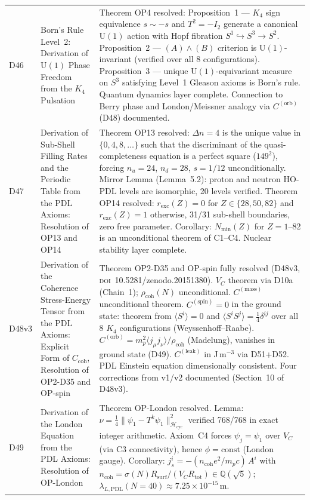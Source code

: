 \documentclass[11pt,a4paper]{article}
\theoremstyle{plain}
\theoremstyle{definition}
\theoremstyle{remark}
\newcommand{\Rsurf}{R_{\mathrm{surf}}}
\newcommand{\Rtot}{R_{\mathrm{tot}}}
\newcommand{\rhocoh}{\rho_{\mathrm{coh}}}
\newcommand{\Ccoh}{C_{\mathrm{coh}}}
\begin{document}
\begin{longtable}{L{1.3cm}L{3.8cm}L{8.0cm}}
D46 & Born's Rule Level~2: Derivation of $\mathrm{U}(1)$ Phase Freedom from the $K_4$ Pulsation~\cite{D46} & \textcolor{proofblue}{Theorem} OP4 resolved: Proposition~1 — $K_4$ sign equivalence $s \sim -s$ and $T^2=-I_2$ generate a canonical $\mathrm{U}(1)$ action with Hopf fibration $S^1\hookrightarrow S^3\to S^2$. Proposition~2 — $(A)\wedge(B)$ criterion is $\mathrm{U}(1)$-invariant (verified over all 8 configurations). Proposition~3 — unique $\mathrm{U}(1)$-equivariant measure on $S^3$ satisfying Level~1 Gleason axioms is Born's rule. Quantum dynamics layer complete. Connection to Berry phase and London/Meissner analogy via $C^{(\mathrm{orb})}$ (D48) documented.\\[0.4em]
D47 & Derivation of Sub-Shell Filling Rates and the Periodic Table from the PDL Axioms: Resolution of OP13 and OP14~\cite{D47} & \textcolor{proofblue}{Theorem} OP13 resolved: $\Delta n=4$ is the unique value in $\{0,4,8,\ldots\}$ such that the discriminant of the quasi-completeness equation is a perfect square ($149^2$), forcing $n_u=24$, $n_d=28$, $s=1/12$ unconditionally. Mirror Lemma (Lemma~5.2): proton and neutron HO-PDL levels are isomorphic, 20 levels verified. \textcolor{proofblue}{Theorem} OP14 resolved: $r_{\mathrm{exc}}(Z)=0$ for $Z\in\{28,50,82\}$ and $r_{\mathrm{exc}}(Z)=1$ otherwise, 31/31 sub-shell boundaries, zero free parameter. Corollary: $N_{\min}(Z)$ for $Z=1$--82 is an unconditional theorem of C1--C4. Nuclear stability layer complete.\\[0.4em]
D48v3 & Derivation of the Coherence Stress-Energy Tensor from the PDL Axioms: Explicit Form of $\Ccoh$, Resolution of OP2-D35 and OP-spin~\cite{D48} & \textcolor{proofblue}{Theorem} OP2-D35 and OP-spin fully resolved (D48v3, \textsc{doi}~10.5281/zenodo.20151380). $V_C$ theorem via D10a (Chain~1); $\rhocoh(N)$ unconditional. $C^{(\mathrm{mass})}$ unconditional theorem. $C^{(\mathrm{spin})}=0$ in the ground state: theorem from $\langle S^i\rangle=0$ and $\langle S^iS^j\rangle=\tfrac{1}{4}\delta^{ij}$ over all 8 $K_4$ configurations (Weyssenhoff--Raabe). $C^{(\mathrm{orb})}=m_p^2\langle j_\mu j_\nu\rangle/\rhocoh$ (Madelung), vanishes in ground state (D49). $C^{(\mathrm{leak})}$ in J\,m$^{-3}$ via D51+D52. PDL Einstein equation dimensionally consistent. Four corrections from v1/v2 documented (Section~10 of D48v3).\\[0.4em]
D49 & Derivation of the London Equation from the PDL Axioms: Resolution of OP-London~\cite{D49} & \textcolor{proofblue}{Theorem} OP-London resolved. Lemma: $\nu = \tfrac{1}{4}\|\psi_1 - T^k\psi_1\|^2_{\mathcal{H}_{\mathrm{cyc}}}$ verified 768/768 in exact integer arithmetic. Axiom~C4 forces $\psi_j = \psi_1$ over $V_C$ (via C3 connectivity), hence $\phi = \mathrm{const}$ (London gauge). Corollary: $j^i_s = -(n_{\mathrm{coh}} e^2 / m_p c)\,A^i$ with $n_{\mathrm{coh}} = \sigma(N)\Rsurf/(V_C\Rtot) \in \mathbb{Q}(\sqrt{5})$; $\lambda_{L,\mathrm{PDL}}(N=40) \approx 7.25 \times 10^{-15}$\,m.\\[0.4em]

\end{longtable}
\end{document}
